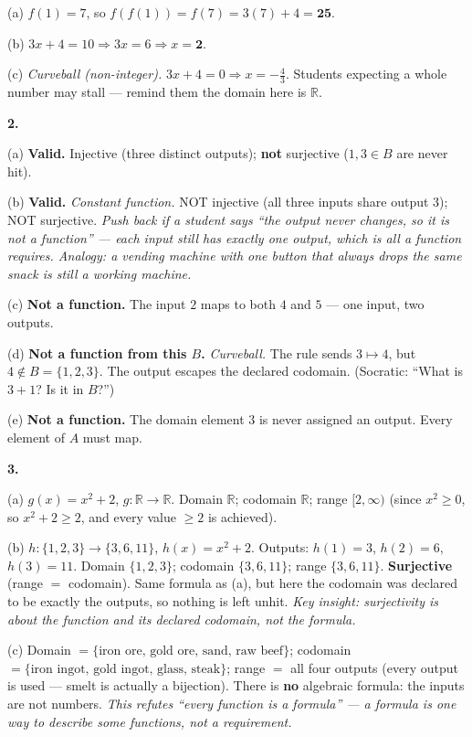 \documentclass[12pt]{article}
\begin{document}
(a)\; $f(1)=7$, so $f(f(1)) = f(7) = 3(7)+4 = \mathbf{25}$.

(b)\; $3x+4 = 10 \Rightarrow 3x = 6 \Rightarrow x = \mathbf{2}$.

(c)\; \textit{Curveball (non-integer).} $3x+4 = 0 \Rightarrow x = -\tfrac{4}{3}$. Students expecting a whole
number may stall --- remind them the domain here is $\mathbb{R}$.

\bigskip
\textbf{2.}

(a)\; \textbf{Valid.} Injective (three distinct outputs); \textbf{not} surjective ($1,3 \in B$ are never hit).

(b)\; \textbf{Valid.} \textit{Constant function.} NOT injective (all three inputs share output $3$); NOT
surjective. \textit{Push back if a student says ``the output never changes, so it is not a function'' --- each
input still has exactly one output, which is all a function requires. Analogy: a vending machine with one button
that always drops the same snack is still a working machine.}

(c)\; \textbf{Not a function.} The input $2$ maps to both $4$ and $5$ --- one input, two outputs.

(d)\; \textbf{Not a function from this $B$.} \textit{Curveball.} The rule sends $3 \mapsto 4$, but
$4 \notin B = \{1,2,3\}$. The output escapes the declared codomain. (Socratic: ``What is $3+1$? Is it in $B$?'')

(e)\; \textbf{Not a function.} The domain element $3$ is never assigned an output. Every element of $A$ must map.

\bigskip
\textbf{3.}

(a)\; $g(x) = x^2+2$, $g\colon \mathbb{R}\to\mathbb{R}$. Domain $\mathbb{R}$; codomain $\mathbb{R}$; range
$[2,\infty)$ (since $x^2 \ge 0$, so $x^2+2 \ge 2$, and every value $\ge 2$ is achieved).

(b)\; $h\colon \{1,2,3\}\to\{3,6,11\}$, $h(x)=x^2+2$. Outputs: $h(1)=3$, $h(2)=6$, $h(3)=11$. Domain
$\{1,2,3\}$; codomain $\{3,6,11\}$; range $\{3,6,11\}$. \textbf{Surjective} (range $=$ codomain). Same formula as
(a), but here the codomain was declared to be exactly the outputs, so nothing is left unhit. \textit{Key insight:
surjectivity is about the function and its declared codomain, not the formula.}

(c)\; Domain $= \{\text{iron ore, gold ore, sand, raw beef}\}$; codomain $= \{\text{iron ingot, gold ingot,
glass, steak}\}$; range $=$ all four outputs (every output is used --- smelt is actually a bijection). There is
\textbf{no} algebraic formula: the inputs are not numbers. \textit{This refutes ``every function is a formula''
--- a formula is one way to describe some functions, not a requirement.}
\end{document}
